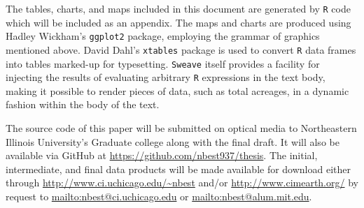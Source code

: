 The tables, charts, and maps included in this document are generated
by \texttt{R} code which will be included as an appendix.  The maps
and charts are produced using Hadley Wickham's
\citeyearpar{Wickham2009} \texttt{ggplot2} package, employing the
grammar of graphics mentioned above.  David Dahl's \texttt{xtables}
package is used to convert \texttt{R} data frames into tables
marked-up for typesetting.  \texttt{Sweave} itself provides a facility
for injecting the results of evaluating arbitrary \texttt{R}
expressions in the text body, making it possible to render pieces of
data, such as total acreages, in a dynamic fashion within the body of the text.

The source code of this paper will be submitted on optical media to
Northeastern Illinois University's Graduate college along with the
final draft.  It will also be available via GitHub at
\url{https://github.com/nbest937/thesis}.  The initial, intermediate,
and final data products will be made available for download either
through \url{http://www.ci.uchicago.edu/~nbest} and\slash or
\url{http://www.cimearth.org/} by request to
\url{mailto:nbest@ci.uchicago.edu} or \url{mailto:nbest@alum.mit.edu}.
